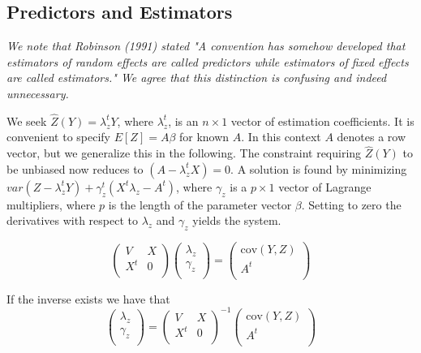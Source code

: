 \documentclass[Main.tex]{subfiles}
\begin{document}

\subsection{Predictors and Estimators}

\emph{We note that Robinson (1991) stated "A convention has somehow developed that estimators of random effects are called predictors while estimators of fixed effects are called estimators." We agree that this distinction is confusing and indeed unnecessary.} \\ \bigskip



We seek $\hat{Z}(Y) = \lambda_{z}^{t}Y$, where $ \lambda_{z}^{t}$, is an $n \times 1$ vector of estimation coefficients. It is convenient to specify $E[Z]=A\beta$ for known $A$. In this context $A$ denotes a row vector, but we generalize this in the following. The constraint requiring $\hat{Z}(Y)$ to be unbiased now reduces to $(A -  \lambda_{z}^{t}X) = 0$. A solution is found by minimizing $var(Z -  \lambda_{z}^{t}Y) + \gamma^t_z (X^t\lambda_{z} - A^t)$, where $\gamma_z$ is a $p \times 1$ vector of Lagrange multipliers, where $p$ is the length of the parameter vector $\beta$. Setting to zero the derivatives with respect to $\lambda_{z}$ and $\gamma_z $ yields the system.




\begin{equation}
\left(
\begin{array}{cc}
V & X \\
X^t & 0 \\
\end{array}
\right)\left(
\begin{array}{c}
\lambda_{z}\\
\gamma_z \\
\end{array}
\right)=\left(
\begin{array}{c}
\mbox{cov}(Y,Z)\\
A^{t} \\
\end{array}
\right)
\end{equation}


If the inverse exists we have that
\begin{equation}
\left(
\begin{array}{c}
\lambda_{z}\\
\gamma_z \\
\end{array}
\right)=\left(
\begin{array}{cc}
V & X \\
X^t & 0 \\
\end{array}
\right) ^{-1}\left(
\begin{array}{c}
\mbox{cov}(Y,Z)\\
A^{t} \\
\end{array}
\right)
\end{equation}
\end{document}
